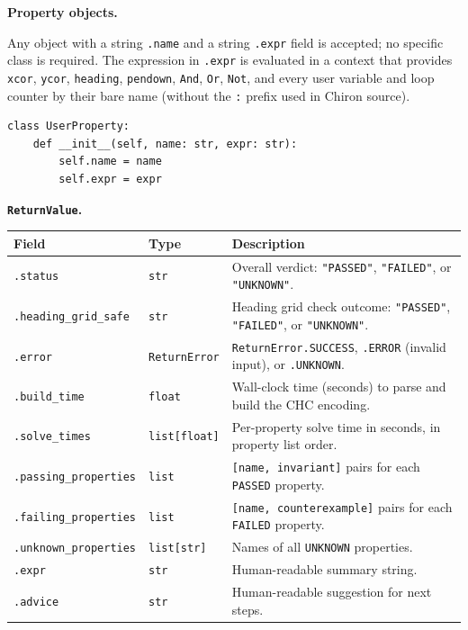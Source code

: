 \noindent\textbf{Property objects.}

Any object with a string \texttt{.name} and a string \texttt{.expr} field is accepted; no specific class is required.
The expression in \texttt{.expr} is evaluated in a context that provides \texttt{xcor}, \texttt{ycor}, \texttt{heading}, \texttt{pendown}, \texttt{And}, \texttt{Or}, \texttt{Not}, and every user variable and loop counter by their bare name (without the \texttt{:} prefix used in Chiron source).

\begin{lstlisting}[style=terminal]
class UserProperty:
    def __init__(self, name: str, expr: str):
        self.name = name
        self.expr = expr
\end{lstlisting}

\noindent\textbf{\texttt{ReturnValue}.}

\begin{longtable}{p{3.7cm} p{2.7cm} p{9.0cm}}
\toprule
\textbf{Field} & \textbf{Type} & \textbf{Description} \\
\midrule
\endhead
\texttt{.status} & \texttt{str} & Overall verdict: \texttt{"PASSED"}, \texttt{"FAILED"}, or \texttt{"UNKNOWN"}. \\
\texttt{.heading\_grid\_safe} & \texttt{str} & Heading grid check outcome: \texttt{"PASSED"}, \texttt{"FAILED"}, or \texttt{"UNKNOWN"}. \\
\texttt{.error} & \texttt{ReturnError} & \texttt{ReturnError.SUCCESS}, \texttt{.ERROR} (invalid input), or \texttt{.UNKNOWN}. \\
\texttt{.build\_time} & \texttt{float} & Wall-clock time (seconds) to parse and build the CHC encoding. \\
\texttt{.solve\_times} & \texttt{list[float]} & Per-property solve time in seconds, in property list order. \\
\texttt{.passing\_properties} & \texttt{list} & \texttt{[name, invariant]} pairs for each \texttt{PASSED} property. \\
\texttt{.failing\_properties} & \texttt{list} & \texttt{[name, counterexample]} pairs for each \texttt{FAILED} property. \\
\texttt{.unknown\_properties} & \texttt{list[str]} & Names of all \texttt{UNKNOWN} properties. \\
\texttt{.expr} & \texttt{str} & Human-readable summary string. \\
\texttt{.advice} & \texttt{str} & Human-readable suggestion for next steps. \\
\bottomrule
\end{longtable}

